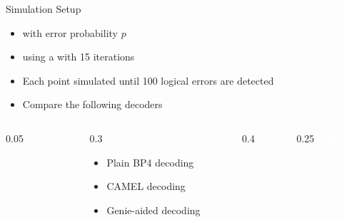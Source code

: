 \documentclass[10pt, aspectratio=169]{beamer}
\newcommand{\BPfour}{BP4}
\begin{document}
\begin{frame}[c]{Simulation Setup}
  \begin{itemize}
    \item {} with error probability $p$
    \item {} using a  with 15 iterations
    \item Each point simulated until 100 logical errors are detected
    \item Compare the following decoders
  \end{itemize}

  \begin{columns}[t,onlytextwidth]
    \begin{column}{0.05\textwidth}
      \textcolor{white}{xxxx}
    \end{column}
    \begin{column}{0.3\textwidth}
      \begin{minipage}[c][2.9cm][c]{\linewidth}
          \vspace{-1em}
        \begin{itemize}
          \item<2-> Plain \BPfour{} decoding
          \item<3-> CAMEL decoding
          \item<4-> Genie-aided decoding
        \end{itemize}
      \end{minipage}

    \end{column}
    \begin{column}{0.4\textwidth}
      \begin{minipage}[c][2.9cm][c]{\linewidth}
      \centering
      \end{minipage}
    \end{column}

    \begin{column}{0.25\textwidth}
      \textcolor{white}{xxxx}
    \end{column}

  \end{columns}
\end{frame}
\end{document}

